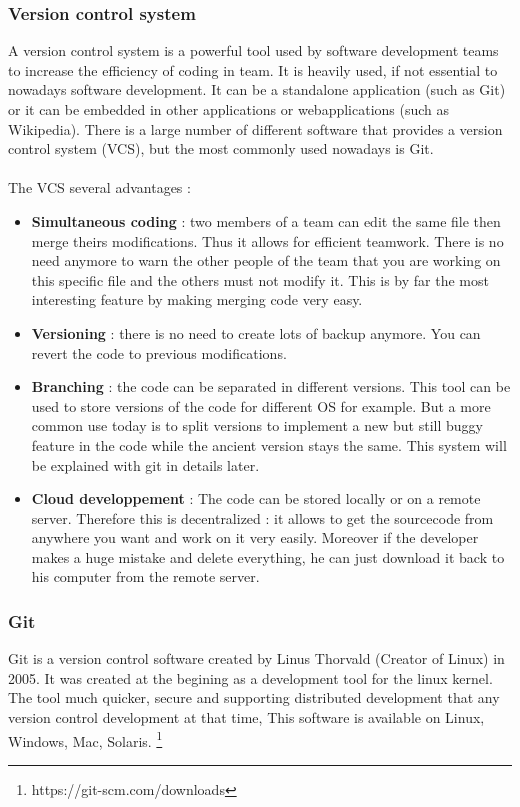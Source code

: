 \documentclass[a4paper]{report}
\begin{document}
\subsubsection{Version control system}
A version control system is a powerful tool used by software development teams to increase the efficiency of coding in team. It is heavily used, if not essential to nowadays software development. It can be a standalone application (such as Git) or it can be embedded in other applications or webapplications (such as Wikipedia). There is a large number of different software that provides a version control system (VCS), but the most commonly used nowadays is Git.\\
\\
The VCS several advantages : 
\begin{itemize}
	\item \textbf{Simultaneous coding} : two members of a team can edit the same file then merge theirs modifications. Thus it allows for efficient teamwork. There is no need anymore to warn the other people of the team that you are working on this specific file and the others must not modify it. This is by far the most interesting feature by making merging code very easy.
    \item \textbf{Versioning} : there is no need to create lots of backup anymore. You can revert the code to previous modifications.
    \item \textbf{Branching} : the code can be separated in different versions. This tool can be used to store versions of the code for different OS for example. But a more common use today is to split versions to implement a new but still buggy feature in the code while the ancient version stays the same. This system will be explained with git in details later.
    \item \textbf{Cloud developpement} : The code can be stored locally or on a remote server. Therefore this is decentralized : it allows to get the sourcecode from anywhere you want and work on it very easily. Moreover if the developer makes a huge mistake and delete everything, he can just download it back to his computer from the remote server. 
\end{itemize}

\subsubsection{Git}

Git is a version control software created by Linus Thorvald (Creator of Linux) in 2005. It was created at the begining as a development tool for the linux kernel. The tool much quicker, secure and supporting distributed development that any version control development at that time, 
This software is available on Linux, Windows, Mac, Solaris. \footnote{https://git-scm.com/downloads} \\
\end{document}
